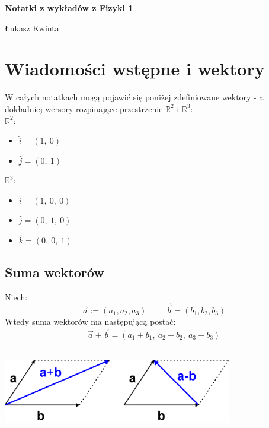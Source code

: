 \documentclass[a4paper]{article}
\date{}
\begin{document}
    \linespread{1.5}
    \begin{titlepage}
        \centering
        \vspace*{\fill}

        \vspace*{0.5cm}

        \huge\bfseries
        Notatki z wykładów z Fizyki 1

        \vspace*{0.5cm}

        \large Łukasz Kwinta

        \vspace*{\fill}
    \end{titlepage}
    
\pagebreak
\tableofcontents
\pagebreak

\section{\huge Wiadomości wstępne i wektory}
    \Large
    W całych notatkach mogą pojawić się poniżej zdefiniowane wektory - a dokładniej 
    wersory rozpinające przestrzenie $\mathbb{R}^2$ i $\mathbb{R}^3$:\\
    $\mathbb{R}^2$:
    \begin{itemize}
        \item [] $\hat{i} = (1,\ 0)$
        \item [] $\hat{j} = (0,\ 1)$
    \end{itemize}
    $\mathbb{R}^3$:
    \begin{itemize}
        \item [] $\hat{i} = (1,\ 0,\ 0)$
        \item [] $\hat{j} = (0,\ 1,\ 0)$
        \item [] $\hat{k} = (0,\ 0,\ 1)$
    \end{itemize}

    \subsection{\LARGE Suma wektorów}
        \Large 
        Niech:
        \[\vec{a} := (a_1, a_2, a_3) \hspace{1cm} \vec{b} = (b_1, b_2, b_3) \]
        Wtedy suma wektorów ma następującą postać:
        \[\vec{a} + \vec{b} = (a_1 + b_1,\ a_2 + b_2,\ a_3 + b_3)\] \\
        \begin{center}
            \includegraphics[width=10cm]{img/suma_wektorow.png} 
        \end{center}
        
\end{document}
